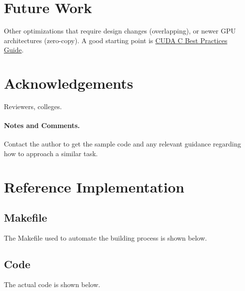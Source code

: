 \documentclass{llncs}
\begin{document}
\section{Future Work}

Other optimizations that require design changes (overlapping), or newer GPU architectures (zero-copy).
A good starting point is \href{http://docs.nvidia.com/cuda/cuda-c-best-practices-guide/}{CUDA C Best Practices Guide}.

\section*{Acknowledgements}

Reviewers, colleges.

\paragraph{Notes and Comments.}
Contact the author to get the sample code and any relevant guidance regarding how to approach a similar task.



\appendix
\section{Reference Implementation}

\subsection{Makefile}

The Makefile used to automate the building process is shown below.



\subsection{Code}

The actual code is shown below.

\begin{multicols}{2}

\restoregeometry
\end{multicols}
\end{document}
